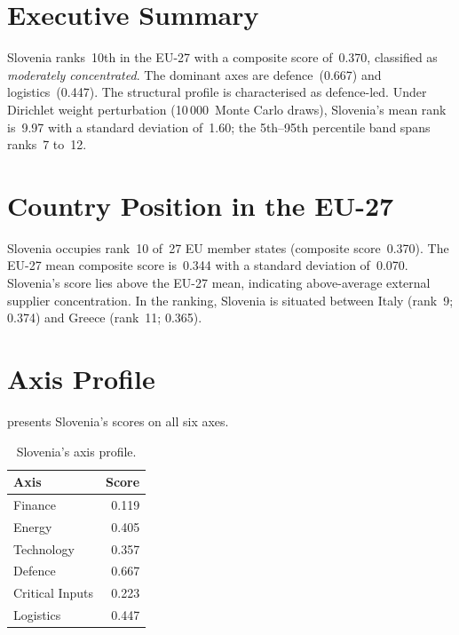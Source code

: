\documentclass[12pt,a4paper]{article}
\begin{document}
\hypersetup{pageanchor=true}
\pagestyle{fancy}
\renewcommand{\headrulewidth}{0.4pt}


\section{Executive Summary}
\label{sec:summary}

Slovenia ranks~10th in the EU-27 with a composite \ISI score of~0.370, classified as \emph{moderately concentrated}.  The dominant axes are defence~(0.667) and logistics~(0.447).  The structural profile is characterised as defence-led.  Under Dirichlet weight perturbation (10\,000~Monte Carlo draws), Slovenia's mean rank is~9.97 with a standard deviation of~1.60; the 5th--95th percentile band spans ranks~7 to~12.


\section{Country Position in the EU-27}
\label{sec:position}

Slovenia occupies rank~10 of~27 EU member states (composite score~0.370).  The EU-27 mean composite score is~0.344 with a standard deviation of~0.070.  Slovenia's score lies above the EU-27 mean, indicating above-average external supplier concentration.  In the ranking, Slovenia is situated between Italy (rank~9; 0.374) and Greece (rank~11; 0.365).


\section{Axis Profile}
\label{sec:axis-profile}

 presents Slovenia's scores on all six \ISI axes.

\begin{table}[htbp]
\centering\small
\caption{Slovenia's \ISI axis profile.}
\label{tab:axis-profile}
\begin{tabular}{@{}lr@{}}
\toprule
\textbf{Axis} & \textbf{Score} \\
\midrule
    Finance           & 0.119 \\
    Energy            & 0.405 \\
    Technology        & 0.357 \\
    Defence           & 0.667 \\
    Critical Inputs   & 0.223 \\
    Logistics         & 0.447 \\
\bottomrule
\end{tabular}
\end{table}
\end{document}
